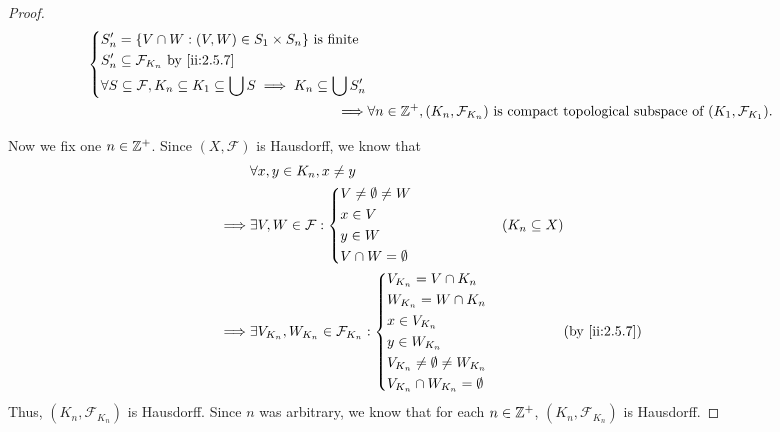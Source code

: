 \begin{proof}
\begin{align*}
\begin{dcases}
                                                                               S_n' = \set{V \cap W : (V, W) \in S_1 \times S_n} \text{ is finite} \\
                                                                               S_n' \subseteq \mathcal{F}_{K_n} \text{ by \cref{ii:2.5.7}}         \\
                                                                               \forall S \subseteq \mathcal{F}, K_n \subseteq K_1 \subseteq \bigcup S \implies K_n \subseteq \bigcup S_n'
                                                                             \end{dcases} \\
    \implies & \forall n \in \Z^+, (K_n, \mathcal{F}_{K_n}) \text{ is compact topological subspace of } (K_1, \mathcal{F}_{K_1}).
  \end{align*}

  Now we fix one \(n \in \mathbb{Z}^+\).
  Since \((X, \mathcal{F})\) is Hausdorff, we know that
  \begin{align*}
             & \forall x, y \in K_n, x \neq y                                                                    \\
    \implies & \exists V, W \in \mathcal{F} : \begin{dcases}
                                                V \neq \emptyset \neq W \\
                                                x \in V                 \\
                                                y \in W                 \\
                                                V \cap W = \emptyset
                                              \end{dcases}                   & (K_n \subseteq X)                 \\
    \implies & \exists V_{K_n}, W_{K_n} \in \mathcal{F}_{K_n} : \begin{dcases}
                                                                  V_{K_n} = V \cap K_n                \\
                                                                  W_{K_n} = W \cap K_n                \\
                                                                  x \in V_{K_n}                       \\
                                                                  y \in W_{K_n}                       \\
                                                                  V_{K_n} \neq \emptyset \neq W_{K_n} \\
                                                                  V_{K_n} \cap W_{K_n} = \emptyset
                                                                \end{dcases} &                   & \by{ii:2.5.7}
  \end{align*}
  Thus, \((K_n, \mathcal{F}_{K_n})\) is Hausdorff.
  Since \(n\) was arbitrary, we know that for each \(n \in \mathbb{Z}^+\), \((K_n, \mathcal{F}_{K_n})\) is Hausdorff.


\end{proof}
